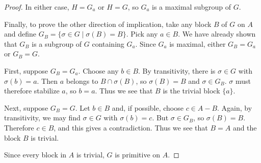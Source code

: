 \begin{enumerate}
\begin{proof}
    In either case, $H = G_a$ or $H = G$, so $G_a$ is a maximal
    subgroup of $G$.

    Finally, to prove the other direction of implication, take any
    block $B$ of $G$ on $A$ and define
    $G_B = \{\sigma\in G\mid\sigma(B) = B\}$. Pick any $a\in B$. We
    have already shown that $G_B$ is a subgroup of $G$ containing
    $G_a$. Since $G_a$ is maximal, either $G_B = G_a$ or $G_B = G$.

    First, suppose $G_B = G_a$. Choose any $b\in B$. By transitivity,
    there is $\sigma\in G$ with $\sigma(b) = a$. Then $a$ belongs to
    $B\cap\sigma(B)$, so $\sigma(B) = B$ and $\sigma\in G_B$. $\sigma$
    must therefore stabilize $a$, so $b = a$. Thus we see that $B$ is
    the trivial block $\{a\}$.

    Next, suppose $G_B = G$. Let $b\in B$ and, if possible, choose
    $c\in A - B$. Again, by transitivity, we may find $\sigma\in G$
    with $\sigma(b) = c$. But $\sigma\in G_B$, so $\sigma(B) =
    B$. Therefore $c\in B$, and this gives a contradiction. Thus we
    see that $B = A$ and the block $B$ is trivial.

    Since every block in $A$ is trivial, $G$ is primitive on $A$.
  \end{proof}
\end{enumerate}
